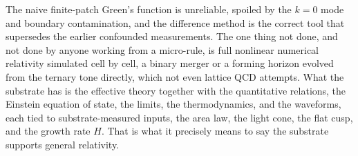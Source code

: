 The naive finite-patch Green's function is unreliable, spoiled by the $k = 0$ mode and boundary contamination,
and the difference method is the correct tool that supersedes the earlier confounded measurements. The one thing
not done, and not done by anyone working from a micro-rule, is full nonlinear numerical relativity simulated cell
by cell, a binary merger or a forming horizon evolved from the ternary tone directly, which not even lattice QCD
attempts. What the substrate has is the effective theory together with the quantitative relations, the Einstein
equation of state, the limits, the thermodynamics, and the waveforms, each tied to substrate-measured inputs, the
area law, the light cone, the flat cusp, and the growth rate $H$. That is what it precisely means to say the
substrate supports general relativity.
